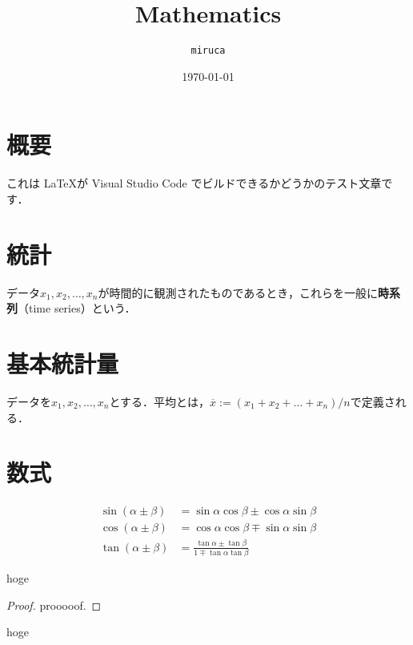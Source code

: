 \documentclass[dvipdfmx,uplatex]{jsarticle}
\begin{document}
\title{Mathematics}
\author{\texttt{miruca}}
\date{\today}
\maketitle

\section{概要}
これは \LaTeX が Visual Studio Code でビルドできるかどうかのテスト文章です．

\section{統計}
データ$x_1,x_2,\dots,x_n$が時間的に観測されたものであるとき，これらを一般に\textbf{時系列}（time series）という．

\section{基本統計量}
データを$x_1,x_2,\dots,x_n$とする．平均とは，$\overline{x}:=(x_1 + x_2 + \dots + x_n)/n$で定義される．

\section{数式}
\begin{align}
    \sin(\alpha \pm \beta) &= \sin \alpha \cos \beta \pm \cos \alpha \sin \beta \\
    \cos(\alpha \pm \beta) &= \cos \alpha \cos \beta \mp \sin \alpha \sin \beta \\
    \tan(\alpha \pm \beta) &= \frac{\tan \alpha \pm \tan \beta}{1 \mp \tan \alpha \tan \beta}
\end{align}

\begin{defbox}
    \begin{definition}
      hoge
    \end{definition}
\end{defbox}

\begin{proof}
    prooooof.  
\end{proof}
%
\vspace{\baselineskip}
\begin{theorembox}
    \begin{theorem}
      hoge
    \end{theorem}
\end{theorembox}
\end{document}
